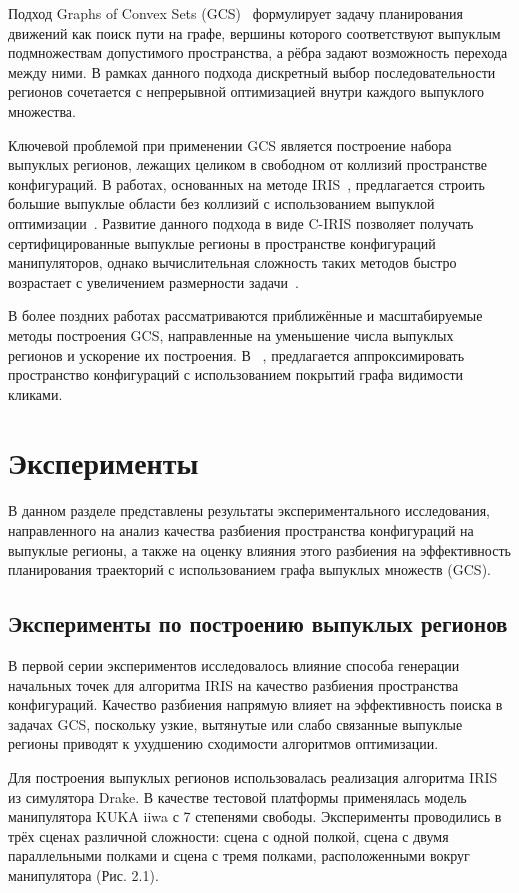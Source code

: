 \documentclass[a4paper,12pt]{extarticle}
\begin{document}
Подход Graphs of Convex Sets (GCS)~\cite{5} формулирует задачу планирования
движений как поиск пути на графе, вершины которого соответствуют
выпуклым подмножествам допустимого пространства, а рёбра задают
возможность перехода между ними. В рамках данного подхода дискретный
выбор последовательности регионов сочетается с непрерывной оптимизацией
внутри каждого выпуклого множества.

Ключевой проблемой при применении GCS является построение набора
выпуклых регионов, лежащих целиком в свободном от коллизий пространстве
конфигураций. В работах, основанных на методе IRIS~\cite{6}, предлагается
строить большие выпуклые области без коллизий с использованием выпуклой оптимизации~\cite{24}.
Развитие данного подхода в виде C-IRIS позволяет получать
сертифицированные выпуклые регионы в пространстве конфигураций
манипуляторов, однако вычислительная сложность таких методов быстро
возрастает с увеличением размерности задачи~\cite{25}.

В более поздних работах рассматриваются приближённые и масштабируемые
методы построения GCS, направленные на уменьшение числа выпуклых
регионов и ускорение их построения. В ~\cite{7}, предлагается
аппроксимировать пространство конфигураций с использованием покрытий
графа видимости кликами.


\section{Эксперименты}

В данном разделе представлены результаты экспериментального исследования,
направленного на анализ качества разбиения пространства конфигураций на
выпуклые регионы, а также на оценку влияния этого разбиения на эффективность
планирования траекторий с использованием графа выпуклых множеств (GCS).

\subsection{Эксперименты по построению выпуклых регионов}

В первой серии экспериментов исследовалось влияние способа генерации
начальных точек для алгоритма IRIS на качество разбиения пространства
конфигураций. Качество разбиения напрямую влияет на эффективность поиска
в задачах GCS, поскольку узкие, вытянутые или слабо связанные выпуклые
регионы приводят к ухудшению сходимости алгоритмов оптимизации.

Для построения выпуклых регионов использовалась реализация алгоритма IRIS
из симулятора Drake. В качестве тестовой платформы применялась модель
манипулятора KUKA iiwa с 7 степенями свободы. Эксперименты проводились в
трёх сценах различной сложности: сцена с одной полкой, сцена с двумя
параллельными полками и сцена с тремя полками, расположенными вокруг
манипулятора (Рис. 2.1).
\end{document}
